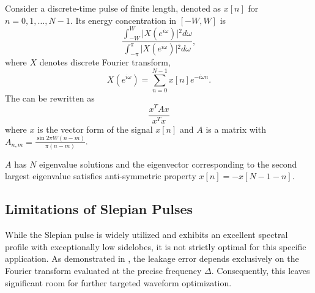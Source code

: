 Consider a discrete-time pulse of finite length, denoted as $x[n]$ for $n = 0, 1, \dots, N-1$.
Its energy concentration in $[-W,W]$ is
\begin{equation}
  \frac{\int_{-W}^{W} \vert{}X(e^{i\omega})\vert{}^2 d\omega}{\int_{-\pi}^{\pi} \vert{}X(e^{i\omega})\vert{}^2
    d\omega},
  \label{eq:energy_concentration}
\end{equation}
where $X$ denotes discrete Fourier transform,
$$X(e^{i\omega}) = \sum_{n=0}^{N-1} x[n]e^{-i\omega n}.$$
The  can be rewritten as
$$\dfrac{x^TAx}{x^Tx}$$
where $x$ is the vector form of the signal $x[n]$ and $A$ is a matrix with $A_{n,m} = \frac{\sin 2\pi W(n - m)}{\pi(n - m)}$.

$A$ has $N$ eigenvalue solutions and the eigenvector corresponding to the second largest eigenvalue satisfies
anti-symmetric property $x[n] = -x[N-1-n]$.

\subsection{Limitations of Slepian Pulses}
While the Slepian pulse is widely utilized and exhibits an excellent spectral profile with exceptionally low sidelobes,
it is not strictly optimal for this specific application.
As demonstrated in , the leakage error depends exclusively on the Fourier transform evaluated at the precise
frequency $\Delta$. Consequently, this leaves significant room for further targeted waveform optimization.
